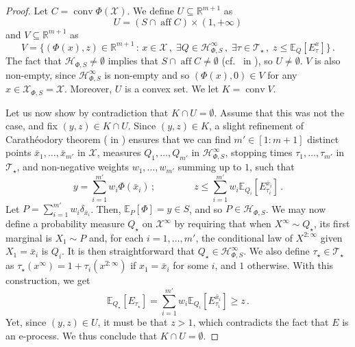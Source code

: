 \documentclass[10pt, a4paper]{article}
\newcommand{\E}{\mathbb E}
\newcommand{\Hh}{\mathcal H}
\newcommand{\HhP}{\Hh_{\Phi,S}}
\newcommand{\R}{\mathbb R}
\newcommand{\T}{\mathcal T}
\newcommand{\X}{\mathcal X}
\newcommand{\XP}{\X_{\Phi,S}}
\DeclareMathOperator{\aff}{aff}
\DeclareMathOperator{\conv}{conv}
\begin{document}
\begin{proof}
    Let $C = \conv\Phi(\X)$. We define $U\subseteq \R^{m+1}$ as $$U = (S\cap\aff C)\times(1,+\infty)$$ and $V\subseteq\R^{m+1}$ as $$V = \{(\Phi(x),z)\in\R^{m+1}\,:\,x\in\X\,,\;\exists Q\in\HhP^\infty\,,\;\exists\tau\in\T_\star\,,\;z\leq\E_Q[E^x_\tau]\}\,.$$
    The fact that $\HhP\neq\emptyset$ implies that $S\cap\aff C\neq\emptyset$ (cf.~ in ), so $U\neq\emptyset$. $V$ is also non-empty, since $\HhP^\infty$ is non-empty and so $(\Phi(x),0)\in V$ for any $x\in \XP=\X$. Moreover, $U$ is a convex set. We let $K = \conv V$. 

    Let us now show by contradiction that $K\cap U=\emptyset$. Assume that this was not the case, and fix $(y,z)\in K\cap U$. Since $(y,z)\in K$, a slight refinement of Carathéodory theorem ( in ) ensures that we can find $m'\in[1: m+1]$ distinct points $\bar x_1, \dots, \bar x_{m'}$ in $\X$, measures $Q_1,\dots, Q_{m'}$ in $\HhP^\infty$, stopping times $\tau_1,\dots,\tau_{m'}$ in $\T_\star$, and non-negative weights $w_1,\dots,w_{m'}$ summing up to $1$, such that 
    $$y = \sum_{i=1}^{m'}w_i\Phi(\bar x_i)\,;\qquad\qquad z \leq\sum_{i=1}^{m'}w_i\E_{Q_i}[E^{\bar x_i}_{\tau_i}]\,.$$
    Let $P = \sum_{i=1}^{m'}w_i\delta_{\bar x_i}$. Then, $\E_P[\Phi] = y\in S$, and so $P\in\HhP$. We may now define a probability measure $Q_\star$ on $\X^\infty$ by requiring that when $X^\infty\sim Q_\star$, its first marginal is $X_1\sim P$ and, for each $i=1,\dots, m'$, the conditional law of $X^{2:\infty}$ given $X_1=\bar x_i$ is $Q_i$. It is then straightforward that $Q_\star\in\HhP^\infty$. We also define $\tau_\star\in\T_\star$ as $\tau_\star(x^\infty) = 1 + \tau_i(x^{2:\infty})$ if $x_1 = \bar x_i$ for some $i$, and $1$ otherwise. With this construction, we get
    $$\E_{Q_\star}[E_{\tau_\star}] = \sum_{i=1}^{m'} w_i \E_{Q_i}[E^{\bar x_i}_{\tau_i}]\geq z\,.$$
    Yet, since $(y,z)\in U$, it must be that $z>1$, which contradicts the fact that $E$ is an e-process. We thus conclude that $K\cap U= \emptyset$. 


\end{proof}
\end{document}

